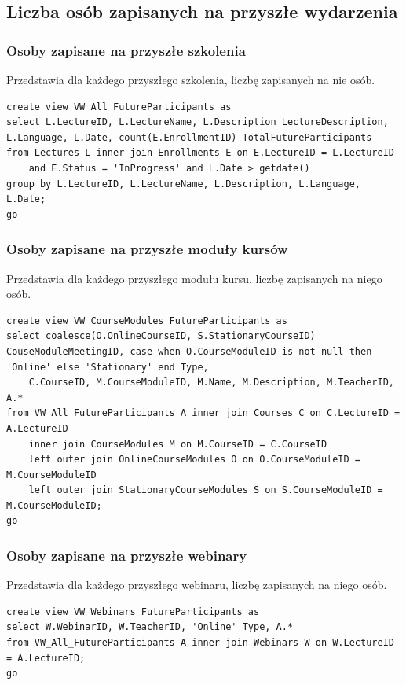\documentclass[11pt,a4paper]{article}
\begin{document}
\subsection{Liczba osób zapisanych na przyszłe wydarzenia}

\subsubsection{Osoby zapisane na przyszłe szkolenia}
Przedstawia dla każdego przyszłego szkolenia, liczbę zapisanych na nie osób.
\begin{Verbatim}[breaklines=true]
create view VW_All_FutureParticipants as
select L.LectureID, L.LectureName, L.Description LectureDescription, L.Language, L.Date, count(E.EnrollmentID) TotalFutureParticipants
from Lectures L inner join Enrollments E on E.LectureID = L.LectureID
    and E.Status = 'InProgress' and L.Date > getdate()
group by L.LectureID, L.LectureName, L.Description, L.Language, L.Date;
go
\end{Verbatim}

\subsubsection{Osoby zapisane na przyszłe moduły kursów}
Przedstawia dla każdego przyszłego modułu kursu, liczbę zapisanych na niego osób.
\begin{Verbatim}[breaklines=true]
create view VW_CourseModules_FutureParticipants as
select coalesce(O.OnlineCourseID, S.StationaryCourseID) CouseModuleMeetingID, case when O.CourseModuleID is not null then 'Online' else 'Stationary' end Type,
    C.CourseID, M.CourseModuleID, M.Name, M.Description, M.TeacherID, A.*
from VW_All_FutureParticipants A inner join Courses C on C.LectureID = A.LectureID
    inner join CourseModules M on M.CourseID = C.CourseID
    left outer join OnlineCourseModules O on O.CourseModuleID = M.CourseModuleID
    left outer join StationaryCourseModules S on S.CourseModuleID = M.CourseModuleID;
go
\end{Verbatim}

\subsubsection{Osoby zapisane na przyszłe webinary}
Przedstawia dla każdego przyszłego webinaru, liczbę zapisanych na niego osób.
\begin{Verbatim}[breaklines=true]
create view VW_Webinars_FutureParticipants as
select W.WebinarID, W.TeacherID, 'Online' Type, A.*
from VW_All_FutureParticipants A inner join Webinars W on W.LectureID = A.LectureID;
go
\end{Verbatim}
\end{document}
